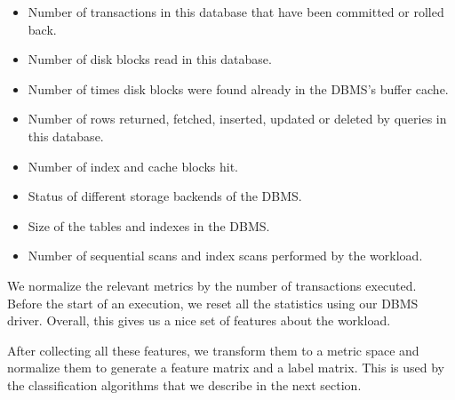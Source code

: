   \begin{itemize}    
    \item {Number of transactions in this database that have been committed or
    rolled back.}
    \item {Number of disk blocks read in this database.}
    \item {Number of times disk blocks were found already in the DBMS's buffer
    cache.}
    \item {Number of rows returned, fetched, inserted, updated or deleted by
    queries in this database.}
    \item {Number of index and cache blocks hit.}
    \item {Status of different storage backends of the DBMS.}
    \item {Size of the tables and indexes in the DBMS.}
    \item {Number of sequential scans and index scans performed by the
    workload.}
  \end{itemize}
  
  	We normalize the relevant metrics by the number of transactions executed.
  	Before the start of an execution, we reset all the statistics using our
  	DBMS driver. Overall, this gives us a nice set of features about the
  	workload. 

After collecting all these features, we transform them to a metric space and
normalize them to generate a feature matrix and a label matrix. This is 
used by the classification algorithms that we describe in the next section.
